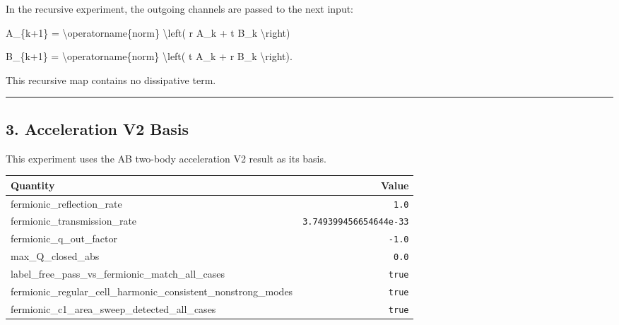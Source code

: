 \documentclass[
]{article}
\newenvironment{Shaded}{}{}
\newcommand{\NormalTok}[1]{#1}
\newcounter{none} %
\begin{document}
In the recursive experiment, the outgoing channels are passed to the
next input:

\begin{Shaded}
\begin{Highlighting}[]
\NormalTok{A\_\{k+1\}}
\NormalTok{=}
\NormalTok{\textbackslash{}operatorname\{norm\}}
\NormalTok{\textbackslash{}left(}
\NormalTok{r A\_k + t B\_k}
\NormalTok{\textbackslash{}right)}
\end{Highlighting}
\end{Shaded}

\begin{Shaded}
\begin{Highlighting}[]
\NormalTok{B\_\{k+1\}}
\NormalTok{=}
\NormalTok{\textbackslash{}operatorname\{norm\}}
\NormalTok{\textbackslash{}left(}
\NormalTok{t A\_k + r B\_k}
\NormalTok{\textbackslash{}right).}
\end{Highlighting}
\end{Shaded}

This recursive map contains no dissipative term.

\begin{center}\rule{0.5\linewidth}{0.5pt}\end{center}

\subsection{3. Acceleration V2 Basis}\label{acceleration-v2-basis}

This experiment uses the AB two-body acceleration V2 result as its
basis.

{\def\LTcaptype{none} %
\begin{longtable}[]{@{}lr@{}}
\toprule\noalign{}
Quantity & Value \\
\midrule\noalign{}
\endhead
\bottomrule\noalign{}
\endlastfoot
fermionic\_reflection\_rate & \texttt{1.0} \\
fermionic\_transmission\_rate & \texttt{3.749399456654644e-33} \\
fermionic\_q\_out\_factor & \texttt{-1.0} \\
max\_Q\_closed\_abs & \texttt{0.0} \\
label\_free\_pass\_vs\_fermionic\_match\_all\_cases & \texttt{true} \\
fermionic\_regular\_cell\_harmonic\_consistent\_nonstrong\_modes &
\texttt{true} \\
fermionic\_c1\_area\_sweep\_detected\_all\_cases & \texttt{true} \\
\end{longtable}
}
\end{document}

